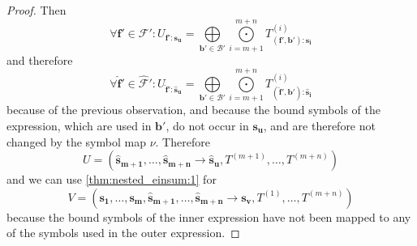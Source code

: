 \begin{proof}
    Then
    $$\forall \bm{f'} \in \mathcal{F}': U_{\bm{f'}: \bm{s_u}} = \bigoplus\limits_{\bm{b'} \in \mathcal{B}'}\bigodot\limits_{i = m + 1}^{m + n} T^{(i)}_{(\bm{f'}, \bm{b'}):\bm{s_{i}}}$$
    and therefore
    $$\forall \bm{\hat{f}'} \in \mathcal{\hat{F}}': U_{\bm{\hat{f}}': \bm{\hat{s}_u}} = \bigoplus\limits_{\bm{b'} \in \mathcal{B}'}\bigodot\limits_{i = m + 1}^{m + n} T^{(i)}_{(\bm{\hat{f}}', \bm{b'}):\bm{\hat{s}_{i}}}$$
    because of the previous observation,
    and because the bound symbols of the expression, which are used in $\bm{b'}$, do not occur in $\bm{s_u}$, and are therefore not changed by the symbol map $\nu$.
    Therefore
    $$U = (\bm{\hat{s}_{m + 1}},\dots,\bm{\hat{s}_{m + n}} \rightarrow \bm{\hat{s}_u}, T^{(m + 1)},\dots,T^{(m + n)})$$
    and we can use \autoref{thm:nested_einsum:1} for
    $$V = (\bm{s_1}, \dots, \bm{s_m}, \bm{\hat{s}_{m + 1}}, \dots, \bm{\hat{s}_{m + n}} \rightarrow \bm{s_v}, T^{(1)}, \dots, T^{(m + n)})$$
    because the bound symbols of the inner expression have not been mapped to any of the symbols used in the outer expression.
\end{proof}
\bigskip